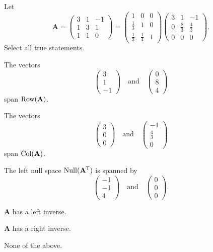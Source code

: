 \documentclass[11pt,oneside]{article}
\begin{document}
\begin{problem}
Let
\[
\mathbf A=
\begin{pmatrix}
3&1&-1\\
1&3&1\\
1&1&0
\end{pmatrix}
=
\begin{pmatrix}
1&0&0\\
\frac13&1&0\\
\frac13&\frac14&1
\end{pmatrix}
\begin{pmatrix}
3&1&-1\\
0&\frac83&\frac43\\
0&0&0
\end{pmatrix}.
\]
Select all true statements.
\begin{problemchoices}
\item The vectors
\[
\begin{pmatrix}3\\1\\-1\end{pmatrix}
\quad\text{and}\quad
\begin{pmatrix}0\\8\\4\end{pmatrix}
\]
span $\operatorname{Row}(\mathbf A)$.
\item The vectors
\[
\begin{pmatrix}3\\0\\0\end{pmatrix}
\quad\text{and}\quad
\begin{pmatrix}-1\\\frac43\\0\end{pmatrix}
\]
span $\operatorname{Col}(\mathbf A)$.
\item The left null space $\operatorname{Null}(\mathbf A^{\mathsf T})$ is spanned by
\[
\begin{pmatrix}-1\\-1\\4\end{pmatrix}
\quad\text{and}\quad
\begin{pmatrix}0\\0\\0\end{pmatrix}.
\]
\item $\mathbf A$ has a left inverse.
\item $\mathbf A$ has a right inverse.
\item None of the above.
\end{problemchoices}
\end{problem}
\end{document}
